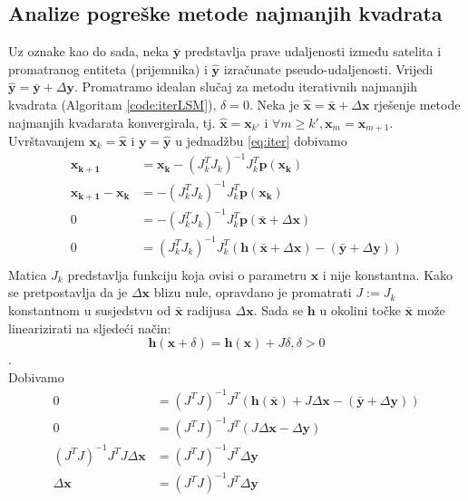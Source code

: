 \documentclass[a4paper,twoside,12pt]{memoir} %
\begin{document}
\subsection{Analize pogreške metode najmanjih kvadrata}
Uz oznake kao do sada, neka $\bar{\mathbf{y}}$ predstavlja prave udaljenosti između satelita i promatranog entiteta (prijemnika) i $\hat{\mathbf{y}}$ izračunate pseudo-udaljenosti. 
Vrijedi
$\hat{\mathbf{y}} = \bar{\mathbf{y}} + \Delta \mathbf{y}$.
Promatramo idealan slučaj za metodu iterativnih najmanjih kvadrata (Algoritam \ref{code:iterLSM}), $\delta = 0$.
Neka je $\hat{\mathbf{x}} = \bar{\mathbf{x}} + \Delta \mathbf{x}$ rješenje metode najmanjih kvadarata konvergirala, tj. 
$\hat{\mathbf{x}} = \mathbf{x}_{k'}$ i $\forall m \geq k', \mathbf{x}_m = \mathbf{x}_{m+1}$.
Uvrštavanjem $\mathbf{x}_k = \hat{\mathbf{x}}$ i $\mathbf{y} = \hat{\mathbf{y}}$ u jednadžbu \ref{eq:iter} dobivamo
\begin{align*}
	\mathbf{x_{k+1}} &= \mathbf{x_{k}} - (J_k^TJ_k)^{-1}J_k^T \mathbf{p}(\mathbf{x_k}) \\
	\mathbf{x_{k+1}} - \mathbf{x_{k}} &= - (J_k^TJ_k)^{-1}J_k^T \mathbf{p}(\mathbf{x_k}) \\
	0 &= - (J_k^TJ_k)^{-1}J_k^T \mathbf{p}(\bar{\mathbf{x}} + \Delta \mathbf{x}) \\
	0 &= (J_k^TJ_k)^{-1}J_k^T (\mathbf{h}(\bar{\mathbf{x}} + \Delta \mathbf{x}) -(\bar{\mathbf{y}} + \Delta \mathbf{y}))\\
\end{align*}
Matica $J_k$ predstavlja funkciju koja ovisi o parametru $\mathbf{x}$ i nije konstantna.
Kako 
se pretpostavlja da je $\Delta \mathbf{x}$ blizu nule, opravdano je promatrati $J := J_k$ konstantnom u susjedstvu od $\bar{\mathbf{x}}$ radijusa $\Delta \mathbf{x}$.
Sada se $\mathbf{h}$ u okolini točke $\bar{\mathbf{x}}$ može linearizirati na sljedeći način:
$$\mathbf{h}(\mathbf{x}+\delta) = \mathbf{h}(\mathbf{x}) + J \delta, \delta > 0$$.\\
Dobivamo
\begin{align*}
0 &= (J^TJ)^{-1}J^T (\mathbf{h}(\bar{\mathbf{x}}) + J\Delta \mathbf{x} -(\bar{\mathbf{y}} + \Delta \mathbf{y}))\\
0 &= (J^TJ)^{-1}J^T (J\Delta \mathbf{x} - \Delta \mathbf{y})\\
(J^TJ)^{-1}J^T J\Delta \mathbf{x}& = (J^TJ)^{-1}J^T \Delta \mathbf{y}\\
\Delta \mathbf{x} &= (J^TJ)^{-1}J^T \Delta \mathbf{y}\\
\end{align*}
\end{document}
